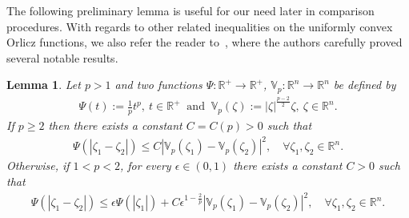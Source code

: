 \documentclass[a4paper, 11pt]{article}
\newtheorem{lemma}[theorem]{Lemma}
\begin{document}
The following preliminary lemma is useful for our need later in comparison procedures. With regards to other related inequalities on the uniformly convex Orlicz functions, we also refer the reader to~\cite[Appendix B]{DFTW20}, where the authors carefully proved several notable results. 
\begin{lemma}\label{lem-Phi}
Let $p >1$ and two functions $\Psi: \mathbb{R}^+ \to \mathbb{R}^+$, $\mathbb{V}_{p}: \mathbb{R}^n \to \mathbb{R}^n$ be defined by
\begin{align}\label{def-Phi}
\Psi(t) := \frac{1}{p}t^p, \  t \in \mathbb{R}^+ \ \mbox{ and }  \ \mathbb{V}_{p}(\zeta) := |\zeta|^{\frac{p-2}{2}}\zeta, \ \zeta \in \mathbb{R}^n.
\end{align}
If $p \ge 2$ then there exists a constant $C = C(p)>0$ such that
\begin{align}\label{vphi-1}
\Psi(|\zeta_1-\zeta_2|) \le C |\mathbb{V}_{p}(\zeta_1) - \mathbb{V}_{p}(\zeta_2)|^2, \quad \forall \zeta_1, \zeta_2 \in \mathbb{R}^n.
\end{align}
Otherwise, if $1<p<2$, for every $\epsilon \in (0,1)$ there exists a constant $C>0$ such that
\begin{align}\label{vphi-2}
\Psi(|\zeta_1-\zeta_2|) \le \epsilon \Psi(|\zeta_1|) + C {\epsilon}^{1 -\frac{2}{p}} |\mathbb{V}_{p}(\zeta_1) - \mathbb{V}_{p}(\zeta_2)|^2, \quad \forall \zeta_1, \zeta_2 \in \mathbb{R}^n.
\end{align}
\end{lemma}
\end{document}
